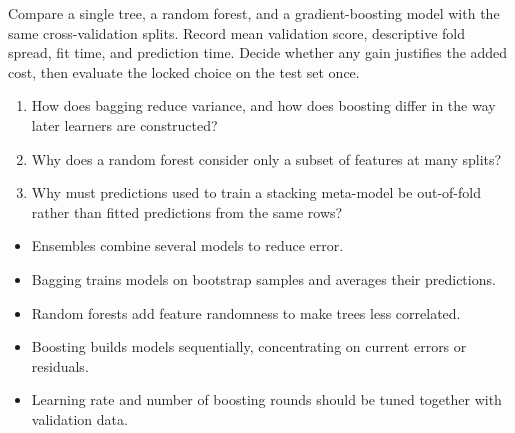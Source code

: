 \begin{tryit}
Compare a single tree, a random forest, and a gradient-boosting model with the same cross-validation splits. Record mean validation score, descriptive fold spread, fit time, and prediction time. Decide whether any gain justifies the added cost, then evaluate the locked choice on the test set once.
\end{tryit}




\begin{quickcheck}
\begin{enumerate}
  \item How does bagging reduce variance, and how does boosting differ in the way later learners are constructed?
  \item Why does a random forest consider only a subset of features at many splits?
  \item Why must predictions used to train a stacking meta-model be out-of-fold rather than fitted predictions from the same rows?
\end{enumerate}
\end{quickcheck}

\begin{chapterrecap}
\begin{itemize}
  \item Ensembles combine several models to reduce error.
  \item Bagging trains models on bootstrap samples and averages their predictions.
  \item Random forests add feature randomness to make trees less correlated.
  \item Boosting builds models sequentially, concentrating on current errors or residuals.
  \item Learning rate and number of boosting rounds should be tuned together with validation data.
\end{itemize}
\end{chapterrecap}
